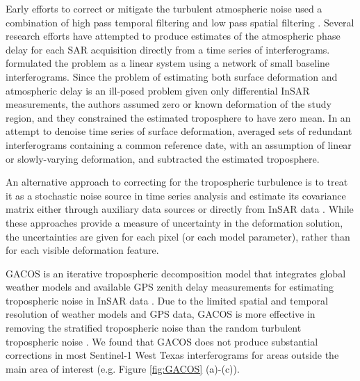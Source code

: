 \documentclass{utexasthesis}
\begin{document}
Early efforts to correct or mitigate the turbulent atmospheric noise used a combination of high pass temporal filtering and low pass spatial filtering \citep{Ferretti2001PermanentScatterersSar, Berardino2002NewAlgorithmSurface}.
Several research efforts have attempted to produce estimates of the atmospheric phase delay for each SAR acquisition directly from a time series of interferograms. \citep{Liu2012SatelliteRadarInterferometry} formulated the problem as a linear system using a network of small baseline interferograms. Since the problem of estimating both surface deformation and atmospheric delay is an ill-posed problem given only differential InSAR measurements, the authors assumed zero or known deformation of the study region, and they constrained the estimated troposphere to have zero mean. In an attempt to denoise time series of surface deformation, \citep{Tymofyeyeva2015MitigationAtmosphericPhase} averaged sets of redundant interferograms containing a common reference date, with an assumption of linear or slowly-varying deformation, and subtracted the estimated troposphere.

An alternative approach to correcting for the tropospheric turbulence is to treat it as a stochastic noise source in time series analysis \citep{Simons2007InterferometricSyntheticAperture, Agram2015NoiseModelInsar} and estimate its covariance matrix either through auxiliary data sources \citep{Barnhart2013CharacterizingEstimatingNoise, Parker2015SystematicAssessmentAtmospheric} or directly from InSAR data \citep{Lohman2005SomeThoughtsUse}. While these approaches provide a measure of uncertainty in the deformation solution, the uncertainties are given for each pixel (or each model parameter), rather than for each visible deformation feature.




GACOS is an iterative tropospheric decomposition model that integrates global weather models and available GPS zenith delay measurements for estimating tropospheric noise in InSAR data \citep{Yu2018InterferometricSyntheticAperture}. Due to the limited spatial and temporal resolution of weather models and GPS data, GACOS is more effective in removing the stratified tropospheric noise \citep{Doin2009CorrectionsStratifiedTropospheric} than the random turbulent tropospheric noise \citep{Emardson2003NeutralAtmosphericDelay}. 
We found that GACOS does not produce substantial corrections in most Sentinel-1 West Texas interferograms for areas outside the main area of interest (e.g. Figure \ref{fig:GACOS} (a)-(c)). 
\end{document}
